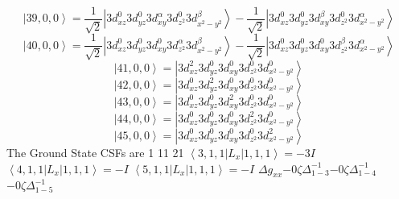 \documentclass[11pt]{article}
\begin{document}
\begin{equation*}
\left|39,0,0\right>=\frac{1}{\sqrt{2}}\left|3d_{xz}^{0}3d_{yz}^{0}3d_{xy}^{\alpha}3d_{z^2}^{0}3d_{x^2-y^2}^{\beta}\right>-\frac{1}{\sqrt{2}}\left|3d_{xz}^{0}3d_{yz}^{0}3d_{xy}^{\beta}3d_{z^2}^{0}3d_{x^2-y^2}^{\alpha}\right>\end{equation*}
\begin{equation*}
\left|40,0,0\right>=\frac{1}{\sqrt{2}}\left|3d_{xz}^{0}3d_{yz}^{0}3d_{xy}^{0}3d_{z^2}^{\alpha}3d_{x^2-y^2}^{\beta}\right>-\frac{1}{\sqrt{2}}\left|3d_{xz}^{0}3d_{yz}^{0}3d_{xy}^{0}3d_{z^2}^{\beta}3d_{x^2-y^2}^{\alpha}\right>\end{equation*}
\begin{equation*}
\left|41,0,0\right>=\left|3d_{xz}^{2}3d_{yz}^{0}3d_{xy}^{0}3d_{z^2}^{0}3d_{x^2-y^2}^{0}\right>\end{equation*}
\begin{equation*}
\left|42,0,0\right>=\left|3d_{xz}^{0}3d_{yz}^{2}3d_{xy}^{0}3d_{z^2}^{0}3d_{x^2-y^2}^{0}\right>\end{equation*}
\begin{equation*}
\left|43,0,0\right>=\left|3d_{xz}^{0}3d_{yz}^{0}3d_{xy}^{2}3d_{z^2}^{0}3d_{x^2-y^2}^{0}\right>\end{equation*}
\begin{equation*}
\left|44,0,0\right>=\left|3d_{xz}^{0}3d_{yz}^{0}3d_{xy}^{0}3d_{z^2}^{2}3d_{x^2-y^2}^{0}\right>\end{equation*}
\begin{equation*}
\left|45,0,0\right>=\left|3d_{xz}^{0}3d_{yz}^{0}3d_{xy}^{0}3d_{z^2}^{0}3d_{x^2-y^2}^{2}\right>\end{equation*}
The Ground State CSFs are 1 11 21 \newline\newline\newline
$\left\langle3,1,1\left|L_{x}\right|1,1,1\right\rangle=-3I$\newline
$\left\langle4,1,1\left|L_{x}\right|1,1,1\right\rangle=-I$\newline
$\left\langle5,1,1\left|L_{x}\right|1,1,1\right\rangle=-I$\newline
\newline$\Delta g_{xx}$\newline\newline$-0\zeta \Delta_{1-3}^{-1}$\newline$-0\zeta \Delta_{1-4}^{-1}$\newline$-0\zeta \Delta_{1-5}^{-1}$\newline\newline
\end{document}
